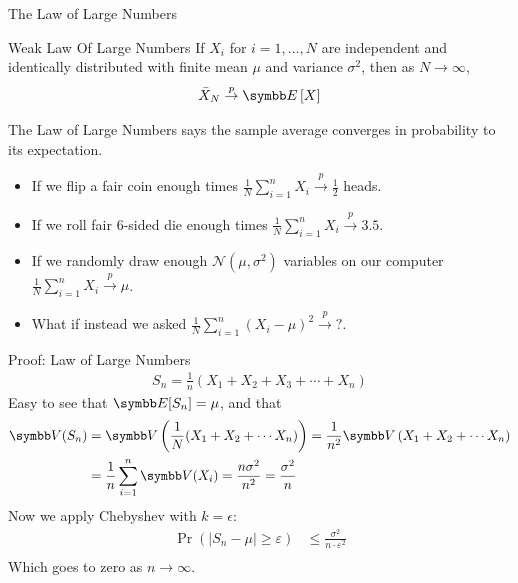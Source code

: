 \documentclass[aspectratio=169,11pt]{beamer}
\begin{document}
\begin{frame}{The Law of Large Numbers}
\begin{center}
\begin{minipage}{.8\textwidth}
	\begin{block}{Weak Law Of Large Numbers}
\vspace{0.3cm}
		If $X_i$ for $i=1,\dots,N$ are \alert{independent and identically distributed} with finite mean $\mu$ and variance $\sigma^2$,
		then as $N\rightarrow \infty$,\[
			\bar{X}_N \overset{p}{\rightarrow} \E\left[X\right]
		\]
	\end{block}
\end{minipage}
\end{center}
The Law of Large Numbers says the sample average converges in probability to its expectation.
\begin{itemize}
\item If we flip a fair coin enough times $\frac{1}{N}\sum_{i=1}^n X_i \overset{p}{\to} \frac{1}{2}$ heads.
\item If we roll fair 6-sided die enough times $\frac{1}{N}\sum_{i=1}^n X_i \overset{p}{\to} 3.5$.
\item If we randomly draw enough $\mathcal{N}(\mu,\sigma^2)$ variables on our computer $\frac{1}{N}\sum_{i=1}^n X_i \overset{p}{\to} \mu$.
\item What if instead we asked $\frac{1}{N}\sum_{i=1}^n (X_i -\mu)^2 \overset{p}{\to} ?$.
\end{itemize}
\end{frame}


\begin{frame}{Proof: Law of Large Numbers}
\begin{align*}
S_n = \frac{1}{n} (X_1 + X_2 + X_3 + \cdots + X_n)
\end{align*}
Easy to see that $\E[S_n] = \mu$, and that
\begin{align*}
\Var (S_n) &= \Var\left(\frac{1}{N}(X_1 + X_2 + \cdots X_n) \right)= \frac{1}{n^2} \Var \left(X_1 + X_2 + \cdots X_n \right) \\
&= \frac{1}{n}\sum_{i=1}^n \Var(X_i)= \frac{n \sigma^2}{n^2} = \frac{\sigma^2}{n} 
\end{align*}
Now we apply Chebyshev with $k=\epsilon$:
\begin{align*}
\Pr\left(|S_n - \mu| \geq \varepsilon\right) &\leq \frac{\sigma^2}{n \cdot \varepsilon^2}\\
\end{align*}
Which goes to zero as $n \rightarrow \infty$.
\end{frame}
\end{document}
